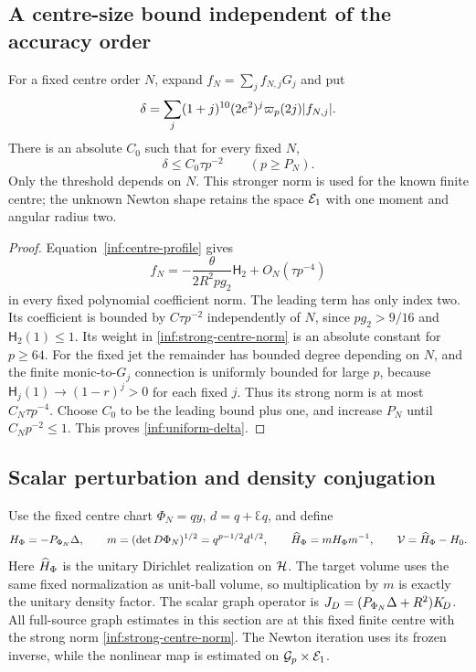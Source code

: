 \subsection{A centre-size bound independent of the accuracy order}

\begin{lemma}\label{inf:uniform-centre-size}
For a fixed centre order $N$, expand $f_N=\sum_j f_{N,j}G_j$ and put
\begin{equation}\label{inf:strong-centre-norm}
 \delta=\sum_j(1+j)^{10}(2e^2)^j\varpi_p(2j)|f_{N,j}|.
\end{equation}
There is an absolute $C_0$ such that for every fixed $N$,
\begin{equation}\label{inf:uniform-delta}
 \delta\le C_0\tau p^{-2}\qquad(p\ge P_N).
\end{equation}
Only the threshold depends on $N$. This stronger norm is used for
the known finite centre; the unknown Newton shape retains the
space $\mathcal E_1$ with one moment and angular radius two.
\end{lemma}
\begin{proof}
Equation~\eqref{inf:centre-profile} gives
\[
 f_N=-\frac{\theta}{2R^2pg_2}\mathsf H_2+O_N(\tau p^{-4})
\]
in every fixed polynomial coefficient norm.
The leading term has only index two. Its coefficient is bounded
by $C\tau p^{-2}$ independently of $N$, since $pg_2>9/16$ and
$\mathsf H_2(1)\le1$. Its weight in \eqref{inf:strong-centre-norm} is an
absolute constant for $p\ge64$.
For the fixed jet the remainder has bounded degree depending on
$N$, and the finite monic-to-$G_j$ connection is uniformly
bounded for large $p$, because
$\mathsf H_j(1)\to(1-r)^j>0$ for each fixed $j$.
Thus its strong norm is at most $C_N\tau p^{-4}$.
Choose $C_0$ to be the leading bound plus one, and increase $P_N$
until $C_Np^{-2}\le1$. This proves \eqref{inf:uniform-delta}.
\end{proof}

\subsection{Scalar perturbation and density conjugation}

Use the fixed centre chart $\Phi_N=qy$, $d=q+\Euler q$, and define
\begin{equation}\label{inf:density-operators}
 H_\Phi=-P_{\Phi_N}\Delta,\qquad
 m=(\det D\Phi_N)^{1/2}=q^{p-1/2}d^{1/2},\qquad
 \widehat H_\Phi=mH_\Phi m^{-1},\qquad \mathcal V=\widehat H_\Phi-H_0.
\end{equation}
Here $\widehat H_\Phi$ is the unitary Dirichlet realization on $\mathcal{H}$.
The target volume uses the same fixed normalization as unit-ball
volume, so multiplication by $m$ is exactly the unitary density
factor. The scalar graph operator is
$J_D=(P_{\Phi_N}\Delta+R^2)K_{\!D}$.
All full-source graph estimates in this section are at this
fixed finite centre with the strong norm
\eqref{inf:strong-centre-norm}. The Newton iteration uses its
frozen inverse, while the nonlinear map is estimated on
$\mathcal{G}_p\times\mathcal E_1$.

